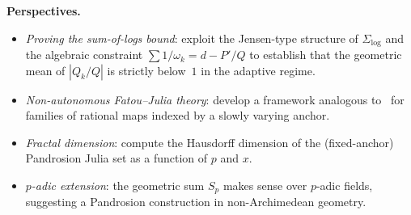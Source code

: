 \documentclass[10pt,a4paper,oneside]{book}
\theoremstyle{definition}
\theoremstyle{remark}
\begin{document}
\medskip

\textbf{Perspectives.}
\begin{itemize}
  \item \emph{Proving the sum-of-logs bound}: exploit the Jensen-type structure of $\Sigma_{\log}$ and the algebraic constraint $\sum 1/\omega_k = d - P'/Q$ to establish that the geometric mean of $|Q_k/Q|$ is strictly below~$1$ in the adaptive regime.
  \item \emph{Non-autonomous Fatou--Julia theory}: develop a framework analogous to~\cite{milnor} for families of rational maps indexed by a slowly varying anchor.
  \item \emph{Fractal dimension}: compute the Hausdorff dimension of the (fixed-anchor) Pandrosion Julia set as a function of $p$ and $x$.
  \item \emph{$p$-adic extension}: the geometric sum $S_p$ makes sense over $p$-adic fields, suggesting a Pandrosion construction in non-Archimedean geometry.
\end{itemize}
\end{document}
